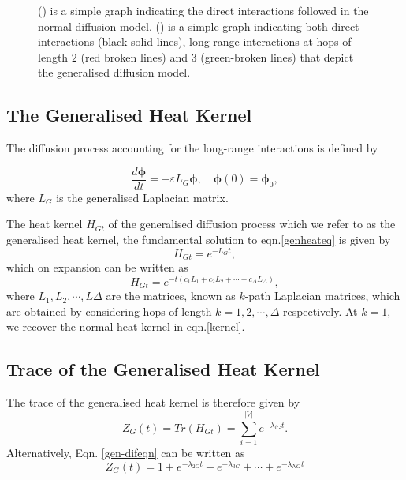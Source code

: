\documentclass[12pt]{article}
\begin{document}
\begin{figure}[H]
\begin{subfigure}[b]{0.3\textwidth}
		\caption{}
		\label{graph-longrange}
	\end{subfigure}
	\caption{() is a simple graph indicating the direct interactions followed in the normal diffusion model. () is a simple graph indicating both direct interactions (black solid lines), long-range interactions at hops of length $2$ (red broken lines) and $3$ (green-broken lines) that depict the generalised diffusion model.    }
	\label{long-range-demo}
\end{figure}


\subsection{The Generalised Heat Kernel}
The diffusion process accounting for the long-range interactions is defined by

\begin{equation}
\frac{d\boldsymbol{\phi}}{dt} =  -\varepsilon L_{G} \boldsymbol{\phi}, \quad \boldsymbol{\phi}(0) = \boldsymbol{\phi}_0 ,
\label{genheateq}
\end{equation}
where $L_G$ is the generalised Laplacian matrix.

The heat kernel $H_{Gt}$ of the generalised diffusion process which we refer to as the generalised heat kernel, the fundamental solution to eqn.\ref{genheateq} is given by 
\begin{equation}
H_{Gt} = e^{-L_{G}t},
\end{equation}
which on expansion can be written as 
\begin{equation}
H_{Gt} = e^{-t(c_{1}L_{1} + c_{2}L_{2} + \cdots + c_{\Delta}L_{\Delta})},
\end{equation}
where $L_1, L_2, \cdots, L{\Delta}$ are the matrices, known as $k$-path Laplacian matrices, which are obtained by considering hops of length $k=1,2,\cdots, \Delta$ respectively. At $k=1$, we recover the normal heat kernel in eqn.\ref{kernel}.

 \subsection{Trace of the Generalised Heat Kernel}
The trace of the generalised heat kernel is therefore given by
\begin{equation}
Z_{G}(t) = Tr(H_{Gt}) = \sum_{i=1}^{|V|} e^{-\lambda_{iG} t}.
\label{Genkerneltrace}
\end{equation}
Alternatively, Eqn. \ref{gen-difeqn} can be written as 
\begin{equation}
Z_{G}(t) =  1+ e^{-\lambda_{2G} t} + e^{-\lambda_{3G}} + \cdots + e^{-\lambda_{NG} t}
\end{equation}
\end{document}
